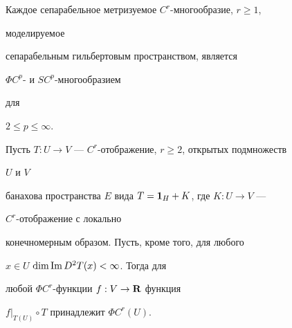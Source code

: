 \begin{cors}


Каждое сепарабельное метризуемое $C^r$-многообразие, $r\ge 1$,


моделируемое


сепарабельным гильбертовым пространством, является


$\Phi C^p$- и $SC^p$-многообразием


для \linebreak 




$2\le p\le\infty$.


\end{cors}





\begin{thms}


Пусть $T:U\to V$ --- $C^r$-отображение, $r\ge 2$, открытых подмножеств


$U$ и $V$


банахова пространства $E$ вида $T=\bold 1_H+K$, где $K:U\to V$ ---


$C^r$-отображение с локально


конечномерным образом. Пусть, кроме того, для любого


$x\in U$ $\dim\operatorname{Im} D^2T(x)<\infty$. Тогда для


любой $\Phi C^r$-функции $f:V\to\bold R$ функция


$f|_{T(U)}\circ T$ принадлежит $\Phi C^r(U)$.


\end{thms}





